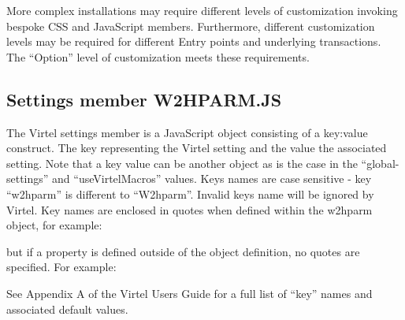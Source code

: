 \documentclass[letterpaper,10pt,english]{sphinxmanual}
\begin{document}
More complex installations may require different levels of customization invoking bespoke CSS and JavaScript members. Furthermore, different customization levels may be required for different Entry points and underlying transactions. The “Option” level of customization meets these requirements.

\ignorespaces 

\subsection{Settings member W2HPARM.JS}
\label{\detokenize{Customization:settings-member-w2hparm-js}}\label{\detokenize{Customization:index-0}}
The Virtel settings member is a JavaScript object consisting of a key:value construct. The key representing the Virtel setting and the value the associated setting. Note that a key value can be another object as is the case in the “global-settings” and “useVirtelMacros” values. Keys names are case sensitive - key “w2hparm” is different to “W2hparm”. Invalid keys name will be ignored by Virtel. Key names are enclosed in quotes when defined within the w2hparm object, for example:

\begin{sphinxVerbatim}[commandchars=\\\{\}]
   
\end{sphinxVerbatim}

but if a property is defined outside of the object definition, no quotes are specified. For example:

\begin{sphinxVerbatim}[commandchars=\\\{\}]
  
\end{sphinxVerbatim}

See Appendix A of the Virtel Users Guide for a full list of “key” names and associated default values.

\ignorespaces 
\end{document}
